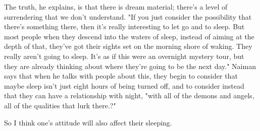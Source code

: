 \documentclass[a4paper]{boek3}
\begin{document}
\begin{displayquote}
The truth, he explains, is that there is dream material; there's a level of surrendering that we don't understand. "If you just consider
the possibility that there's something there, then it's really interesting to let go and to sleep. But most people when they descend into the waters of sleep, instead of aiming at the depth of that, they've got their sights set on the morning shore of waking. They really aren't going to sleep. It's as if this were an overnight mystery tour, but they are already thinking about where they're going to be the next day."
Naiman says that when he talks with people about this, they begin to consider that maybe sleep isn't just eight hours of being turned off, and to consider instead that they can have a relationship with night, "with all of the demons and angels, all of the qualities that lurk there.?"
\end{displayquote}

So I think one's attitude will also affect their sleeping.
\end{document}
